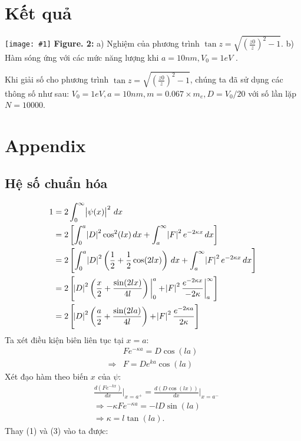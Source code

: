 \documentclass{article}
\newcommand{\image}[3]{
	\begin{center}
		\texttt{[image: \#1]}
		\textbf{Figure. #2:} #3
		\label{fig:#1}
	\end{center}
}
\newcommand{\at}[2]{\bigg\rvert_{#1}^{#2} }
\begin{document}
	\section{Kết quả}
	\image{Final.pdf}{2}{a) Nghiệm của phương trình $\tan z = \sqrt{\left( \frac{z0}{z} \right)^2 - 1}$. b) Hàm sóng ứng với các mức năng lượng khi $a = 10nm, V_0 = 1eV$ .}
	
	Khi giải số cho phương trình $\tan z = \sqrt{\left( \frac{z0}{z} \right)^2 - 1}$, chúng ta đã sử dụng các thông số như sau: $V_0 = 1eV, a = 10 nm,m = 0.067 \times m_e,D = V_0/20$ với số lần lặp $N= 10000$. 

	\clearpage
	\section{Appendix}
	\subsection{Hệ số chuẩn hóa}
	\begin{align*}
		1 &= 2 \int_{0}^{\infty} \abs{\psi(x)}^2 \, dx \\
		&= 2 \left[ \int_{0}^{a} \abs{D}^{2} \cos^{2}(lx) \, dx + \int_{a}^{\infty} \abs{F}^{2} e^{-2\kappa x} \, dx \right] \\
		&= 2 \left[ \int_{0}^{a} \abs{D}^{2} \left(\frac{1}{2} + \frac{1}{2} \cos(2lx)\right) \, dx + \int_{a}^{\infty} \abs{F}^{2} e^{-2\kappa x} \, dx \right]\\
		&= 2\left[\abs{D}^{2}\left(\frac{x}{2} + \frac{\sin(2lx)}{4l}\right)\at{0}{a} + \abs{F}^{2} \frac{e^{-2 \kappa x}}{-2\kappa} \at{a}{\infty} \right]\\
		&= 2 \left[ \abs{D}^2 \left(\frac{a}{2} + \frac{\sin(2la)}{4l}\right) + \abs{F}^2 \frac{e^{-2\kappa a}}{2\kappa}\right]
	\end{align*}
	Ta xét điều kiện biên liên tục tại $x = a$:
	\begin{align}
		&F e^{-\kappa a} = D \cos(la) \nonumber\\
		\Rightarrow &F = D e^{ka} \cos(la)
	\end{align}
	Xét đạo hàm theo biến $x$ của $\psi$:
	\begin{align}
		&\frac{d(F e^{-kx})}{dx} \at{x=a^+}{} = \frac{d(D \cos(lx))}{dx} \at{x=a^-}{} \nonumber \\
		&\Rightarrow -\kappa F e^{-\kappa a}  = - l D \sin(la) \nonumber\\
		&\Rightarrow \kappa = l \tan(la).
	\end{align}
	Thay (1) và (3) vào ta được:
\end{document}
